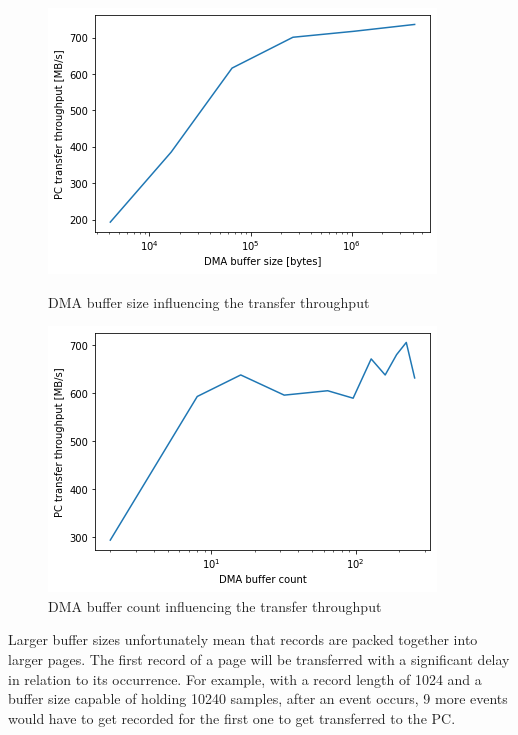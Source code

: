   \begin{figure}[H]
    \centering
    \begin{minipage}{.45\textwidth}
      \centering
      \includegraphics[width=\linewidth]{media/buffer_size_speed.png}
      \caption{DMA buffer size influencing the transfer throughput}
      \label{fig:buffer_size_speed}
    \end{minipage}%
    \hfill
    \begin{minipage}{.45\textwidth}
      \centering
      \includegraphics[width=\linewidth]{media/buffer_count_speed.png}
      \caption{DMA buffer count influencing the transfer throughput}
      \label{fig:buffer_count_speed}
    \end{minipage}
  \end{figure}

Larger buffer sizes unfortunately mean that records are packed together
into larger pages. The first record of a page will be transferred
with a significant delay in relation to its occurrence.
For example, with a record length of 1024 and a buffer size capable
of holding 10240 samples, after an event occurs, 9 more events
would have to get recorded for the first one to get transferred to the PC.


